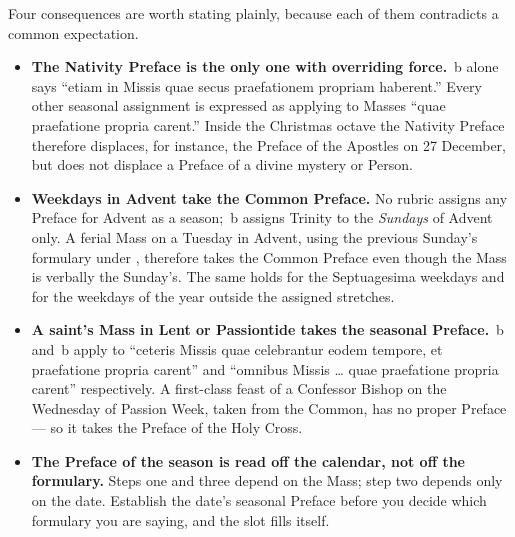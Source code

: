 Four consequences are worth stating plainly, because each of them contradicts
a common expectation.

\begin{itemize}
\item \textbf{The Nativity Preface is the only one with overriding force.}
\,b alone says ``etiam in Missis quae secus praefationem propriam
haberent.'' Every other seasonal assignment is expressed as applying to Masses
``quae praefatione propria carent.'' Inside the Christmas octave the Nativity
Preface therefore displaces, for instance, the Preface of the Apostles on 27
December, but does not displace a Preface of a divine mystery or Person.

\item \textbf{Weekdays in Advent take the Common Preface.} No rubric assigns
any Preface  for Advent as a season; \,b assigns
Trinity to the \emph{Sundays} of Advent only. A ferial Mass on a Tuesday in
Advent, using the previous Sunday's formulary under , therefore takes
the Common Preface even though the Mass is verbally the Sunday's. The same
holds for the Septuagesima weekdays and for the weekdays of the year outside
the assigned stretches.

\item \textbf{A saint's Mass in Lent or Passiontide takes the seasonal
Preface.} \,b and \,b apply to ``ceteris Missis quae
celebrantur eodem tempore, et praefatione propria carent'' and ``omnibus
Missis \dots{} quae praefatione propria carent'' respectively. A first-class
feast of a Confessor Bishop on the Wednesday of Passion Week, taken from the
Common, has no proper Preface --- so it takes the Preface of the Holy Cross.

\item \textbf{The Preface of the season is read off the calendar, not off the
formulary.} Steps one and three depend on the Mass; step two depends only on
the date. Establish the date's seasonal Preface before you decide which
formulary you are saying, and the slot fills itself.
\end{itemize}


